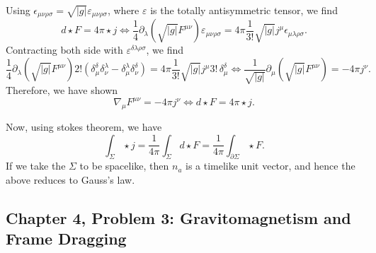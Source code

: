 \begin{enumerate}[label=\alph*)]
\begin{solution}
\begin{equation}
        \end{equation}
        Using $\epsilon_{\mu\nu\rho\sigma} = \sqrt{|g|}\varepsilon_{\mu\nu\rho\sigma}$, where $\varepsilon$ is the totally antisymmetric tensor, we find
        \begin{equation}
            d\star F = 4\pi \star j \iff \frac{1}{4}\partial_\lambda \left(\sqrt{|g|}F^{\mu\nu}\right)\varepsilon_{\mu\nu\rho\sigma} = 4\pi\frac{1}{3!} \sqrt{|g|}j^\mu\epsilon_{\mu\lambda\rho\sigma}.
        \end{equation}
        Contracting both side with $\varepsilon^{\delta\lambda\rho\sigma}$, we find
        \begin{equation}
            \frac{1}{4}\partial_\lambda \left(\sqrt{|g|}F^{\mu\nu}\right)
2!\left(
\delta_\mu^\delta\delta_\nu^\lambda
-
\delta_\mu^\lambda\delta_\nu^\delta
\right) = 4\pi\frac{1}{3!} \sqrt{|g|}j^\mu
3!\,\delta_\mu^\delta \iff \frac{1}{\sqrt{|g|}}\partial_\mu\left(\sqrt{|g|}F^{\mu\nu}\right) = -4\pi j^\nu.
        \end{equation}
        Therefore, we have shown
        \begin{equation}
            \nabla_\mu F^{\mu\nu} = - 4\pi j^\nu \iff d\star F = 4\pi \star j.
        \end{equation}

        Now, using stokes theorem, we have
        \begin{equation}
            \int _\Sigma \star j = \frac{1}{4\pi}\int_\Sigma d\star F =  \frac{1}{4\pi}\int _{\partial \Sigma}\star F.
        \end{equation}
        If we take the $\Sigma$ to be spacelike, then $n_a$ is a timelike unit vector, and hence the above reduces to Gauss's law.
    \end{solution}

\end{enumerate}

\subsection{Chapter 4, Problem 3: Gravitomagnetism and Frame Dragging}

